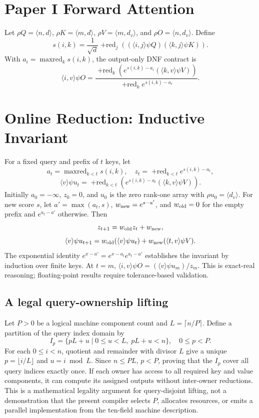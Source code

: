 \documentclass[sigplan,10pt,review,anonymous]{acmart}
\begin{document}
\section{Paper I Forward Attention}
Let $\rho Q=\langle n,d\rangle$, $\rho K=\langle m,d\rangle$, $\rho V=\langle m,d_v\rangle$, and $\rho O=\langle n,d_v\rangle$. Define
\[
s(i,k)=\frac{1}{\sqrt d}\mathop{+red}\nolimits_j((\langle i,j\rangle\psi Q)(\langle k,j\rangle\psi K)).
\]
With $a_i=\mathop{\mathrm{maxred}}\nolimits_k s(i,k)$, the output-only DNF contract is
\[
\langle i,v\rangle\psi O=
\frac{\mathop{+red}\nolimits_k(e^{s(i,k)-a_i}(\langle k,v\rangle\psi V))}
{\mathop{+red}\nolimits_k e^{s(i,k)-a_i}}.
\]
\section{Online Reduction: Inductive Invariant}
For a fixed query and prefix of $t$ keys, let
\[
a_t=\mathop{\mathrm{maxred}}\nolimits_{k<t}s(i,k),\quad z_t=\mathop{+red}\nolimits_{k<t}e^{s(i,k)-a_t},
\]
\[
\langle v\rangle\psi u_t=\mathop{+red}\nolimits_{k<t}(e^{s(i,k)-a_t}(\langle k,v\rangle\psi V)).
\]
Initially $a_0=-\infty$, $z_0=0$, and $u_0$ is the zero rank-one array with $\rho u_0=\langle d_v\rangle$. For new score $s$, let $a'=\max(a_t,s)$, $w_{\rm new}=e^{s-a'}$, and $w_{\rm old}=0$ for the empty prefix and $e^{a_t-a'}$ otherwise. Then
\[
z_{t+1}=w_{\rm old}z_t+w_{\rm new},
\]
\[
\langle v\rangle\psi u_{t+1}
=w_{\rm old}(\langle v\rangle\psi u_t)+w_{\rm new}(\langle t,v\rangle\psi V).
\]
The exponential identity $e^{x-a'}=e^{x-a_t}e^{a_t-a'}$ establishes the invariant by induction over finite keys. At $t=m$, $\langle i,v\rangle\psi O=(\langle v\rangle\psi u_m)/z_m$. This is exact-real reasoning; floating-point results require tolerance-based validation.
\subsection{A legal query-ownership lifting}
Let $P>0$ be a logical machine component count and $L=\lceil n/P\rceil$. Define a partition of the query index domain by
\[
I_p=\{pL+u\mid 0\le u<L,\;pL+u<n\},\quad 0\le p<P.
\]
For each $0\le i<n$, quotient and remainder with divisor $L$ give a unique $p=\lfloor i/L\rfloor$ and $u=i\bmod L$. Since $n\le PL$, $p<P$, proving that the $I_p$ cover all query indices exactly once. If each owner has access to all required key and value components, it can compute its assigned outputs without inter-owner reductions. This is a mathematical legality argument for query-disjoint lifting, not a demonstration that the present compiler selects $P$, allocates resources, or emits a parallel implementation from the ten-field machine description.
\end{document}
